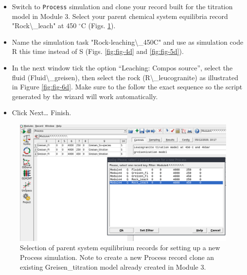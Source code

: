 \documentclass[
]{book}
\begin{document}
\begin{itemize}
\item
  Switch to \texttt{Process} simulation and clone your record built for the titration model in Module 3. Select your parent chemical system equilibria record "Rock\textbackslash\_leach" at 450 \(^\circ\)C (Figs. \ref{fig:fig-3d}).
\item
  Name the simulation task "Rock-leaching\textbackslash\_450C" and use as simulation code R this time instead of S (Figs. \ref{fig:fig-4d} and \ref{fig:fig-5d}).
\item
  In the next window tick the option ``Leaching: Compos source'', select the fluid (Fluid\textbackslash\_greisen), then select the rock (R\textbackslash\_leucogranite) as illustrated in Figure \ref{fig:fig-6d}. Make sure to the follow the exact sequence so the script generated by the wizard will work automatically.
\item
  Click Next\ldots{} Finish.
\end{itemize}

\begin{figure}
\includegraphics[width=1\linewidth]{figures/module4/fig-3} \caption{Selection of parent system equilibrium records for setting up a new Process simulation. Note to create a new Process record clone an existing Greisen\_titration model already created in Module 3.}\label{fig:fig-3d}
\end{figure}
\end{document}
